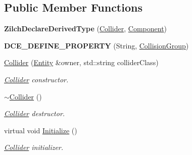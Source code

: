 \subsection*{Public Member Functions}
\begin{DoxyCompactItemize}
\item 
\hypertarget{classDCEngine_1_1Components_1_1Collider_a2ce1675659faea8ea65e29e4d4bcf1a2}{{\bfseries Zilch\-Declare\-Derived\-Type} (\hyperlink{classDCEngine_1_1Components_1_1Collider}{Collider}, \hyperlink{classDCEngine_1_1Component}{Component})}\label{classDCEngine_1_1Components_1_1Collider_a2ce1675659faea8ea65e29e4d4bcf1a2}

\item 
\hypertarget{classDCEngine_1_1Components_1_1Collider_a648f281956bc2ef3db763b98f2a612e8}{{\bfseries D\-C\-E\-\_\-\-D\-E\-F\-I\-N\-E\-\_\-\-P\-R\-O\-P\-E\-R\-T\-Y} (String, \hyperlink{classDCEngine_1_1CollisionGroup}{Collision\-Group})}\label{classDCEngine_1_1Components_1_1Collider_a648f281956bc2ef3db763b98f2a612e8}

\item 
\hyperlink{classDCEngine_1_1Components_1_1Collider_a23fd446735e579c844a9431c57072823}{Collider} (\hyperlink{classDCEngine_1_1Entity}{Entity} \&owner, std\-::string collider\-Class)
\begin{DoxyCompactList}\small\item\em \hyperlink{classDCEngine_1_1Components_1_1Collider}{Collider} constructor. \end{DoxyCompactList}\item 
\hypertarget{classDCEngine_1_1Components_1_1Collider_a1c492143023f9b2552eb662028be9df0}{\hyperlink{classDCEngine_1_1Components_1_1Collider_a1c492143023f9b2552eb662028be9df0}{$\sim$\-Collider} ()}\label{classDCEngine_1_1Components_1_1Collider_a1c492143023f9b2552eb662028be9df0}

\begin{DoxyCompactList}\small\item\em \hyperlink{classDCEngine_1_1Components_1_1Collider}{Collider} destructor. \end{DoxyCompactList}\item 
\hypertarget{classDCEngine_1_1Components_1_1Collider_a805e62e849eaad2bdfd12f9f904bc698}{virtual void \hyperlink{classDCEngine_1_1Components_1_1Collider_a805e62e849eaad2bdfd12f9f904bc698}{Initialize} ()}\label{classDCEngine_1_1Components_1_1Collider_a805e62e849eaad2bdfd12f9f904bc698}

\begin{DoxyCompactList}\small\item\em \hyperlink{classDCEngine_1_1Components_1_1Collider}{Collider} initializer. \end{DoxyCompactList}\end{DoxyCompactItemize}
